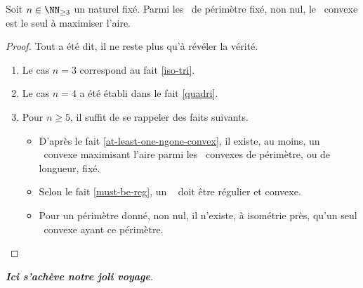 \begin{fact}
    Soit $n \in \NN_{\geq3}$ un naturel fixé.
    Parmi les \ngones\ de périmètre fixé, non nul,
    le \nreg\ convexe est le seul à maximiser l'aire.
\end{fact}


\begin{proof}
    Tout a été dit, il ne reste plus qu'à révéler la vérité.
    \begin{enumerate}
        \item Le cas $n = 3$ correspond au fait \ref{iso-tri}.
        
        \item Le cas $n = 4$ a été établi dans le fait \ref{quadri}.
        
        \item Pour $n \geq 5$, il suffit de se rappeler des faits suivants.
        \begin{itemize}
            \item D'après le fait \ref{at-least-one-ngone-convex}, il existe, au moins, un \ngone\ convexe maximisant l'aire parmi les \ngones\ convexes de périmètre, ou de longueur, fixé.

            \item Selon le fait \ref{must-be-reg}, un \ngone\  doit être régulier et convexe.

            \item Pour un périmètre donné, non nul, il n'existe, à isométrie près, qu'un seul \nreg\ convexe ayant ce périmètre.
        \end{itemize} 
	
	\null\vspace{-6ex}
    \end{enumerate}
\end{proof}

\bigskip
\hfill {\small\itshape\bfseries Ici s'achève notre joli voyage}.